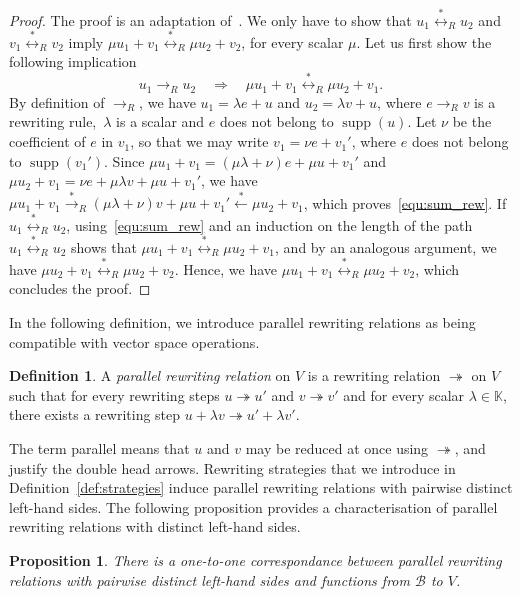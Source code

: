 \documentclass[10pt]{easychair}
\newtheorem{proposition}[theorem]{Proposition}
\theoremstyle{definition}
\newtheorem{definition}[theorem]{Definition}
\DeclareMathOperator{\supp}{supp}
\newcommand\basis{\mathscr{B}}
\newcommand\K{\mathbb{K}}
\newcommand\rewR{\to_R}
\newcommand\parRew{\twoheadrightarrow}
\newcommand\transR{\overset{*}{\to}_R}
\newcommand\equivR{\overset{*}{\leftrightarrow}_R}
\begin{document}
\begin{proof}
  The proof is an adaptation
  of~\cite[Lemma 3.1.3]{GuiraudHoffbeckMalbos19}. We only have to show
  that $u_1\equivR u_2$ and $v_1\equivR v_2$ imply
  $\mu u_1+ v_1\equivR\mu u_2+v_2$, for every scalar $\mu$. Let us first
  show the following implication
  \begin{equation}\label{equ:sum_rew}
    u_1\rewR u_2\quad\Rightarrow\quad\mu u_1+v_1\equivR\mu u_2+v_1.
  \end{equation}
  By
  definition of $\rewR$, we have $u_1=\lambda e+u$ and $u_2=\lambda v+u$,
  where $e\rewR v$ is a rewriting rule,~$\lambda$ is a scalar and $e$
  does not belong to $\supp(u)$. Let $\nu$ be the coefficient of $e$ in
  $v_1$, so that we may write $v_1=\nu e+v_1'$, where $e$ does not belong
  to $\supp(v_1')$. Since $\mu u_1+v_1=(\mu\lambda+\nu)e+\mu u+v_1'$ and
  $\mu u_2+v_1=\nu e+\mu\lambda v +\mu u+v_1'$, we have $\mu u_1+v_1
  \transR(\mu\lambda+\nu)v+\mu u+v_1'\overset{*}{\leftarrow}\mu u_2+v_1$,
  which proves~\eqref{equ:sum_rew}. If $u_1\equivR u_2$,
  using~\eqref{equ:sum_rew} and an induction on the length of the path
  $u_1\equivR u_2$ shows that $\mu u_1+v_1\equivR\mu u_2+v_1$, and by an
  analogous argument, we have $\mu u_2+v_1\equivR\mu u_2+v_2$. Hence, we
  have $\mu u_1+v_1\equivR\mu u_2+v_2$, which concludes the proof.
\end{proof}
\smallskip

In the following definition, we introduce parallel rewriting relations as
being compatible with vector space operations.
\smallskip

\begin{definition}
  A {\em parallel rewriting relation} on $V$ is a rewriting relation
  $\parRew$ on $V$ such that for every rewriting steps $u\parRew u'$ and
  $v\parRew v'$ and for every scalar $\lambda\in\K$, there exists a 
  rewriting step $u+\lambda v\parRew u'+\lambda v'$.
\end{definition}

The term parallel means that $u$ and $v$ may be reduced at once using
$\parRew$, and justify the double head arrows. Rewriting strategies that
we introduce in Definition~\ref{def:strategies} induce parallel rewriting
relations with pairwise distinct left-hand sides. The following
proposition provides a characterisation of parallel rewriting relations
with distinct left-hand sides. 
\smallskip

\begin{proposition}\label{prop:parRew_function}
  There is a one-to-one correspondance between parallel rewriting
  relations with pairwise distinct left-hand sides and functions from
  $\basis$ to $V$.
\end{proposition}
\end{document}
